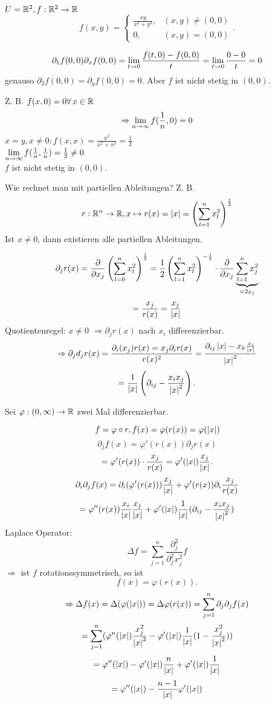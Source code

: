 \documentclass[../ana2.tex]{subfiles}
\begin{document}
\begin{bsp}
    \( U = \mathbb{R}^2, f:\mathbb{R}^2\rightarrow \mathbb{R} \)
    \[ f(x,y) = \begin{cases}
        \frac{xy}{x^2 + y^2}, &(x,y) \neq (0,0)\\
        0, &(x,y) = (0,0)
    \end{cases}. \]

    \[ \partial_1 f(0,0) \partial_x f(0,0) 
    = \lim\limits_{t\rightarrow{}0} \frac{f(t,0) - f(0,0)}{t} 
    = \lim\limits_{t\rightarrow{}0} \frac{0 - 0}{t} = 0 \]
    genauso \( \partial_2 f(0,0) = \partial_y f(0,0) = 0 \).
    Aber \(f\) ist nicht stetig in \( (0,0) \).

    Z. B. \( f(x,0) = 0 \forall x \in \R \)
    \[ \Rightarrow \lim\limits_{n\rightarrow\infty} f(\frac{1}{n},0) = 0 \]
    \( x=y, x \neq 0: f(x,x) = \frac{x^2}{x^2 + x^2} = \frac{1}{2} \) \\
    \( \lim\limits_{n\rightarrow\infty} f(\frac{1}{n}, \frac{1}{n}) = \frac{1}{2} \neq 0 \) \\
    \( f \) ist nicht stetig in \( (0,0) \).
\end{bsp}
Wie rechnet man mit partiellen Ableitungen?
Z. B. \[ r:\mathbb{R}^n\rightarrow \mathbb{R}, x \mapsto r(x) = \left|x\right| 
= \left( \sum_{l=1}^n x_l^2 \right)^{\frac{1}{2}} \]
Ist \( x \neq 0 \), dann existieren alle partiellen Ableitungen.

\[ \partial_j r(x) = \frac{\partial}{\partial x_j} 
\left( \sum_{l=0}^n x_l^2 \right)^{\frac{1}{2}} 
= \frac{1}{2} \left( \sum_{l=1}^n x_l^2 \right)^{-\frac{1}{2}} 
\cdot \frac{\partial}{\partial x_j} \underbrace{\sum_{l=1}^n x_j^2}_{=2x_j} \]
\[ = \frac{x_j}{r(x)} = \frac{x_j}{\left|x\right|} \]
Quotientenregel: \( x \neq 0 \)
\( \Rightarrow \partial_j r(x) \) nach \( x_i \) 
differenzierbar.
\[ \Rightarrow \partial_j d_j r(x) 
= \frac{ \partial_i(x_j) r(x) = x_j \partial_i r(x) }{r(x)^2} 
= \frac{\partial_{ij} \left|x\right| - x_k \frac{x_i}{\left|x\right|}}{\left|x\right|^2} \]
\[ = \frac{1}{\left|x\right|} \left( \partial_{ij} - \frac{x_i x_j}{\left|x\right|^2} \right). \]

Sei \( \varphi:(0,\infty)\rightarrow \mathbb{R} \) zwei Mal differenzierbar. 

\[ f = \varphi \circ r, f(x) = \varphi(r(x)) = \varphi(\left|x\right|) \]
\[ \partial_j f(x) = \varphi'(r(x)) \partial_j r(x) \]
\[ = \varphi'(r(x)) \cdot \frac{x_j}{r(x)} 
= \varphi'(\left|x\right|) \frac{x_j}{\left|x\right|}. \]
\[ \partial_i \partial_j f(x) = \partial_i(\varphi'(r(x))) 
\frac{x_j}{\left|x\right|} + \varphi'(r(x)) \partial_i \frac{x_j}{r(x)} \]
\[ = \varphi''(r(x)) \frac{x_i}{\left|x\right|} \frac{x_j}{\left|x\right|} 
+ \varphi'(\left|x\right|) \frac{1}{\left|x\right|} (\partial_{ij} - \frac{x_i x_j}{\left|x\right|^2}) \]
Laplace Operator:
\[ \Delta f = \sum_{j=1}^n \frac{\partial_j^2}{\partial_j^2 x_j^2} f \]
\( \Rightarrow \) ist \(f\) rotationssymmetrisch, so ist 
\[ f(x) = \varphi(r(x)). \]
\[ \Rightarrow \Delta f(x) = \Delta(\varphi(\left|x\right|)) 
= \Delta \varphi(r(x)) = \sum_{j=1}^n 
\partial_j \partial_j f(x) \]
\[ = \sum_{j=1}^n (\varphi^n(\left|x\right|) \frac{x_j^2}{\left|x\right|^2} 
- \varphi'(\left|x\right|) \frac{1}{\left|x\right|} (1 - \frac{x_j^2}{\left|x\right|^2}) ) \]
\[ = \varphi''(\left|x\right|) - \varphi'(\left|x\right|) \frac{n}{\left|x\right|} 
+ \varphi'(\left|x\right|) \frac{1}{\left|x\right|} \]
\[ = \varphi''(\left|x\right|) - \frac{n-1}{\left|x\right|} \varphi'(\left|x\right|) \]
\end{document}
